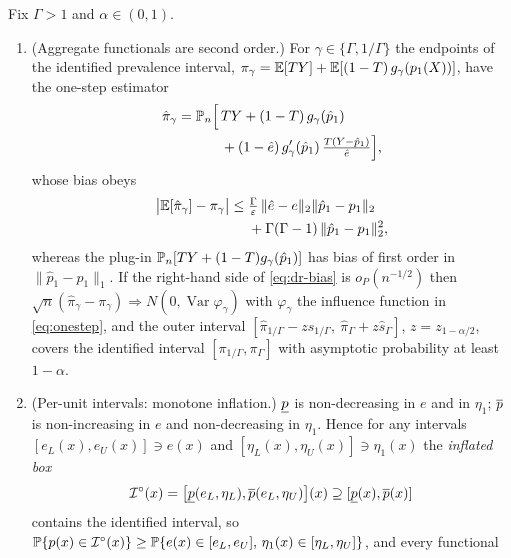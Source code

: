 \begin{theorem}
\label{thm:nuisance}
Fix $\Gamma>1$ and $\alpha\in(0,1)$.
\begin{enumerate}
\item[(a)] \textup{(Aggregate functionals are second order.)} For
$\gamma\in\{\Gamma,1/\Gamma\}$ the endpoints of the identified prevalence
interval, $\pi_\gamma=\mathbb{E}[TY]+\mathbb{E}[(1-T)\,g_\gamma(p_1(X))]$, have the one-step
estimator
\begin{equation}
\begin{aligned}
  \hat\pi_\gamma = \mathbb{P}_n\Big[\,&TY+(1-T)\,g_\gamma(\hat p_1)\\
  &+(1-\hat e)\,g_\gamma'(\hat p_1)\,\tfrac{T(Y-\hat p_1)}{\hat e}\Big],
\end{aligned}
  \label{eq:onestep}
\end{equation}
whose bias obeys
\begin{equation}
\begin{aligned}
  \big|\mathbb{E}[\hat\pi_\gamma]-\pi_\gamma\big|
  \le{}& \tfrac{\Gamma}{\varepsilon}\,\|\hat e-e\|_{2}\|\hat p_1-p_1\|_{2}\\
  &+\Gamma(\Gamma-1)\,\|\hat p_1-p_1\|_{2}^{2},
\end{aligned}
  \label{eq:dr-bias}
\end{equation}
whereas the plug-in $\mathbb{P}_n[TY+(1-T)g_\gamma(\hat p_1)]$ has bias of first order
in $\|\hat p_1-p_1\|_1$. If the right-hand side of \eqref{eq:dr-bias} is
$o_P(n^{-1/2})$ then $\sqrt n(\hat\pi_\gamma-\pi_\gamma)\Rightarrow
N(0,\operatorname{Var}\varphi_\gamma)$ with $\varphi_\gamma$ the influence
function in \eqref{eq:onestep}, and the outer interval
$[\hat\pi_{1/\Gamma}-z\hat s_{1/\Gamma},\ \hat\pi_{\Gamma}+z\hat s_{\Gamma}]$,
$z=z_{1-\alpha/2}$, covers the identified interval $[\pi_{1/\Gamma},\pi_\Gamma]$
with asymptotic probability at least $1-\alpha$.
\item[(b)] \textup{(Per-unit intervals: monotone inflation.)} $\underline{p}$ is
non-decreasing in $e$ and in $\eta_1$; $\overline{p}$ is non-increasing in $e$ and
non-decreasing in $\eta_1$. Hence for any intervals
$[e_L(x),e_U(x)]\ni e(x)$ and $[\eta_L(x),\eta_U(x)]\ni\eta_1(x)$ the
\emph{inflated box}
\begin{equation}
  \mathcal{I}^{\circ}(x)=\big[\underline{p}(e_L,\eta_L),\overline{p}(e_L,\eta_U)\big](x)\supseteq[\underline{p}(x),\overline{p}(x)]
  \label{eq:inflated}
\end{equation}
contains the identified interval, so $\mathbb{P}\{p(x)\in\mathcal{I}^\circ(x)\}\ge
\mathbb{P}\{e(x)\in[e_L,e_U],\,\eta_1(x)\in[\eta_L,\eta_U]\}$, and every functional

\end{enumerate}
\end{theorem}
